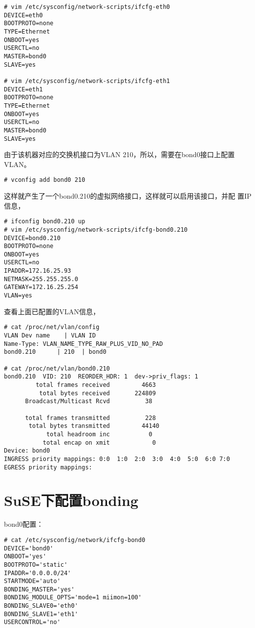 \begin{verbatim}
# vim /etc/sysconfig/network-scripts/ifcfg-eth0
DEVICE=eth0
BOOTPROTO=none
TYPE=Ethernet
ONBOOT=yes
USERCTL=no
MASTER=bond0 
SLAVE=yes

# vim /etc/sysconfig/network-scripts/ifcfg-eth1
DEVICE=eth1
BOOTPROTO=none
TYPE=Ethernet
ONBOOT=yes
USERCTL=no
MASTER=bond0 
SLAVE=yes
\end{verbatim}

由于该机器对应的交换机接口为VLAN 210，所以，需要在bond0接口上配置VLAN。

\begin{verbatim}
# vconfig add bond0 210
\end{verbatim}

这样就产生了一个bond0.210的虚拟网络接口，这样就可以启用该接口，并配
置IP信息，

\begin{verbatim}
# ifconfig bond0.210 up
# vim /etc/sysconfig/network-scripts/ifcfg-bond0.210
DEVICE=bond0.210
BOOTPROTO=none
ONBOOT=yes
USERCTL=no
IPADDR=172.16.25.93
NETMASK=255.255.255.0
GATEWAY=172.16.25.254
VLAN=yes
\end{verbatim}

查看上面已配置的VLAN信息，

\begin{verbatim}
# cat /proc/net/vlan/config
VLAN Dev name	 | VLAN ID
Name-Type: VLAN_NAME_TYPE_RAW_PLUS_VID_NO_PAD
bond0.210      | 210  | bond0

# cat /proc/net/vlan/bond0.210 
bond0.210  VID: 210	 REORDER_HDR: 1  dev->priv_flags: 1
         total frames received         4663
          total bytes received       224809
      Broadcast/Multicast Rcvd          38

      total frames transmitted          228
       total bytes transmitted         44140
            total headroom inc           0
           total encap on xmit            0
Device: bond0
INGRESS priority mappings: 0:0  1:0  2:0  3:0  4:0  5:0  6:0 7:0
EGRESS priority mappings:
\end{verbatim}

\section{SuSE下配置bonding}

bond0配置：

\begin{verbatim}
# cat /etc/sysconfig/network/ifcfg-bond0
DEVICE='bond0'
ONBOOT='yes'
BOOTPROTO='static'
IPADDR='0.0.0.0/24'   
STARTMODE='auto'
BONDING_MASTER='yes'
BONDING_MODULE_OPTS='mode=1 miimon=100'
BONDING_SLAVE0='eth0'
BONDING_SLAVE1='eth1'
USERCONTROL='no'
\end{verbatim}

